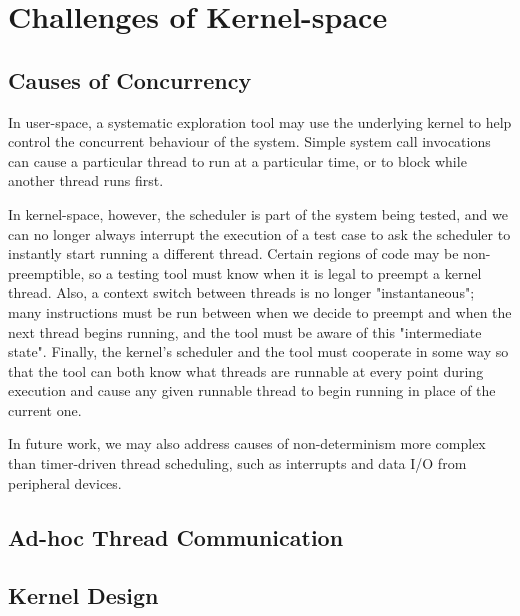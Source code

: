 \section{Challenges of Kernel-space}

\subsection{Causes of Concurrency}

In user-space, a systematic exploration tool may use the underlying kernel to help control the concurrent behaviour of the system. Simple system call invocations can cause a particular thread to run at a particular time, or to block while another thread runs first.

In kernel-space, however, the scheduler is part of the system being tested, and we can no longer always interrupt the execution of a test case to ask the scheduler to instantly start running a different thread.
Certain regions of code may be non-preemptible, so a testing tool must know when it is legal to preempt a kernel thread.
Also, a context switch between threads is no longer "instantaneous"; many instructions must be run between when we decide to preempt and when the next thread begins running, and the tool must be aware of this "intermediate state". %
Finally, the kernel's scheduler and the tool must cooperate in some way so that the tool can both know what threads are runnable at every point during execution and cause any given runnable thread to begin running in place of the current one.

In future work, we may also address causes of non-determinism more complex than timer-driven thread scheduling, such as interrupts and data I/O from peripheral devices.

\subsection{Ad-hoc Thread Communication}

\subsection{Kernel Design}

